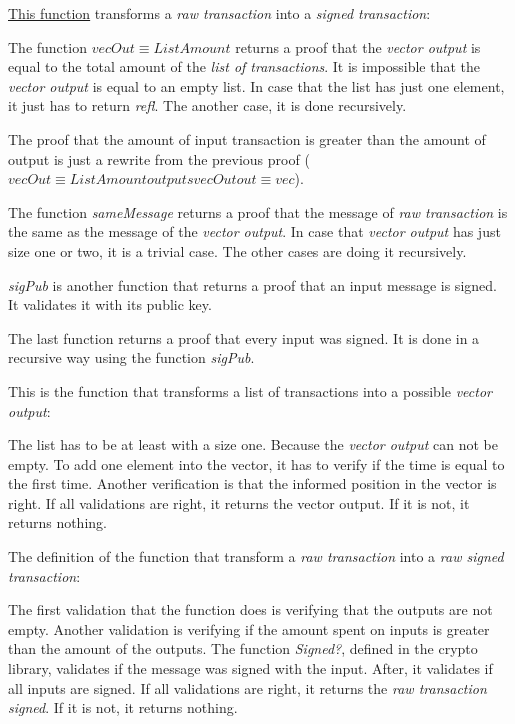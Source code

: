 \hyperref[rawToTX]{This function} transforms a \emph{raw transaction} into a \emph{signed transaction}:


The function $vecOut \equiv ListAmount$ returns a proof that the \emph{vector output} is equal
to the total amount of the \emph{list of transactions}.
It is impossible that the \emph{vector output} is equal to an empty list.
In case that the list has just one element, it just has to return \emph{refl}.
The another case, it is done recursively.

The proof that the amount of input transaction is greater than the amount of output
is just a rewrite from the previous proof ($vecOut≡ListAmount outputs vecOut out≡vec$).

The function \emph{sameMessage} returns a proof that the message of \emph{raw transaction}
is the same as the message of the \emph{vector output}.
In case that \emph{vector output} has just size one or two, it is a trivial case.
The other cases are doing it recursively.

\emph{sigPub} is another function that returns a proof that an input message is signed.
It validates it with its public key.

The last function returns a proof that every input was signed.
It is done in a recursive way using the function \emph{sigPub}.

This is the function that transforms a list of transactions into a possible \emph{vector output}:


The list has to be at least with a size one.
Because the \emph{vector output} can not be empty.
To add one element into the vector, it has to verify if the time is equal to the first time.
Another verification is that the informed position in the vector is right.
If all validations are right, it returns the vector output.
If it is not, it returns nothing.

The definition of the function that transform a \emph{raw transaction} into a
\emph{raw signed transaction}:


The first validation that the function does is verifying that the outputs are not empty.
Another validation is verifying if the amount spent on inputs is greater than the amount of the outputs.
The function \emph{Signed?}, defined in the crypto library, validates if the
message was signed with the input.
After, it validates if all inputs are signed.
If all validations are right, it returns the \emph{raw transaction signed}.
If it is not, it returns nothing.
